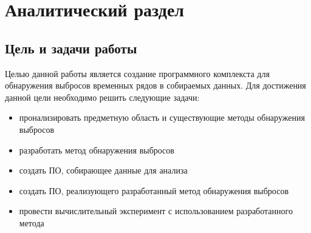\chapter{Аналитический раздел}
\label{cha:analysis}
\section{Цель и задачи работы}
Целью данной работы является создание программного комплекста для обнаружения выбросов временных рядов в собираемых данных.
Для достижения данной цели необходимо решить следующие задачи:
\begin{itemize}
	\item пронализировать предметную область и существующие методы обнаружения выбросов
	\item разработать метод обнаружения выбросов
	\item создать ПО, собирающее данные для анализа
	\item создать ПО, реализующего  разработанный метод обнаружения выбросов
	\item провести вычислительный эксперимент с использованием разработанного метода
	
\end{itemize}
